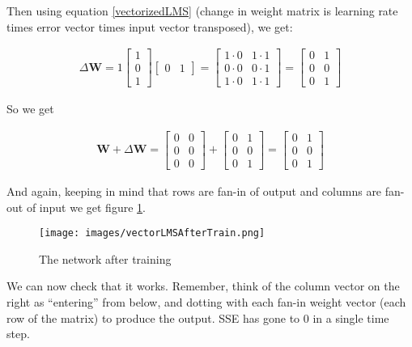 Then using equation \eqref{vectorizedLMS} (change in weight matrix is learning rate times error vector times input vector transposed), we get:

\begin{align*}
\Delta \mathbf{W}  = 1
\begin{bmatrix} 1 \\ 0 \\ 1 \end{bmatrix} 
\begin{bmatrix} 0 & 1 \end{bmatrix} 
= \begin{bmatrix} 1 \cdot 0 & 1 \cdot 1 \\ 0 \cdot 0 & 0 \cdot 1 \\ 1 \cdot 0 & 1 \cdot 1 \end{bmatrix} 
= \begin{bmatrix} 0 & 1 \\ 0 & 0 \\  0 & 1  \end{bmatrix}
\end{align*}

So we get

\begin{align*}
\mathbf{W} + \Delta \mathbf{W}  =
\begin{bmatrix} 0 & 0 \\ 0 & 0 \\  0  & 0  \end{bmatrix} +
\begin{bmatrix} 0 & 1 \\ 0 & 0 \\  0  & 1  \end{bmatrix} =
\begin{bmatrix} 0 & 1 \\ 0 & 0 \\  0  & 1  \end{bmatrix}
\end{align*}

And again, keeping in mind that rows are fan-in of output and columns are fan-out of input we get figure \ref{lms_vector_2}.

\begin{figure}[h]
\centering
\texttt{[image: images/vectorLMSAfterTrain.png]}
\caption[Jeff Yoshimi.]{The network after training}
\label{lms_vector_2}
\end{figure}

We can now check that it works. Remember, think of the column vector on the right as ``entering'' from below, and dotting with each fan-in weight vector (each row of the matrix) to produce the output. SSE has gone to 0 in a single time step.

